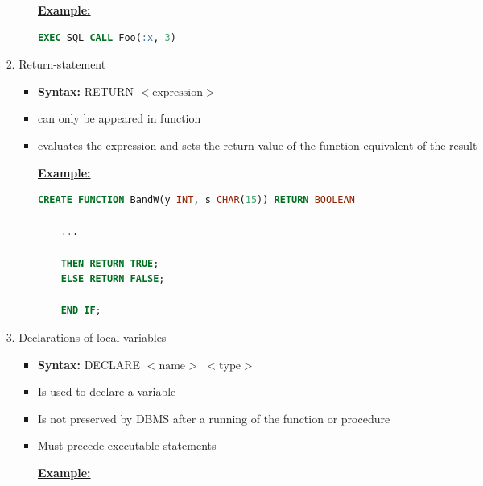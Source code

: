 \documentclass[12pt]{article}
\begin{document}
\begin{enumerate}[1.]
\begin{enumerate}[a)]
\begin{itemize}
\begin{enumerate}[1.]
\begin{itemize}
                    \bigskip

                    \underline{\textbf{Example:}}

                    \bigskip

    \begin{lstlisting}[language=SQL]
    EXEC SQL CALL Foo(:x, 3)
    \end{lstlisting}

                \end{itemize}
                \item Return-statement
                \begin{itemize}
                    \item \textbf{Syntax:} RETURN $<\text{expression}>$
                    \item can only be appeared in function
                    \item evaluates the expression and sets the return-value of the function
                    equivalent of the result

                    \bigskip

                    \underline{\textbf{Example:}}

                    \bigskip

    \begin{lstlisting}[language=SQL]
    CREATE FUNCTION BandW(y INT, s CHAR(15)) RETURN BOOLEAN

    ...

    THEN RETURN TRUE;
    ELSE RETURN FALSE;

    END IF;
    \end{lstlisting}

                \end{itemize}
                \item Declarations of local variables
                \begin{itemize}
                    \item \textbf{Syntax:} DECLARE $<\text{name}>$ $<\text{type}>$
                    \item Is used to declare a variable
                    \item Is not preserved by DBMS after a running of the function or procedure
                    \item Must precede executable statements

                    \bigskip

                    \underline{\textbf{Example:}}


\end{itemize}
\end{enumerate}
\end{itemize}
\end{enumerate}
\end{enumerate}
\end{document}

